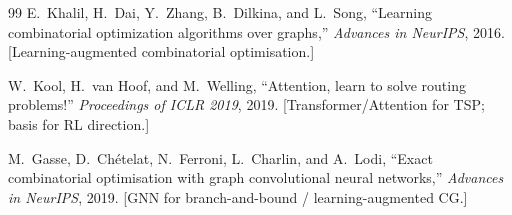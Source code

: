 \documentclass[11pt,a4paper]{article}
\theoremstyle{plain}
\theoremstyle{definition}
\begin{document}
\begin{thebibliography}{99}
E.~Khalil, H.~Dai, Y.~Zhang, B.~Dilkina, and L.~Song,
``Learning combinatorial optimization algorithms over graphs,''
\textit{Advances in NeurIPS}, 2016.
[Learning-augmented combinatorial optimisation.]

W.~Kool, H.~van Hoof, and M.~Welling,
``Attention, learn to solve routing problems!''
\textit{Proceedings of ICLR 2019}, 2019.
[Transformer/Attention for TSP; basis for RL direction.]

M.~Gasse, D.~Ch\'etelat, N.~Ferroni, L.~Charlin, and A.~Lodi,
``Exact combinatorial optimisation with graph convolutional neural networks,''
\textit{Advances in NeurIPS}, 2019.
[GNN for branch-and-bound / learning-augmented CG.]

\end{thebibliography}
\end{document}
